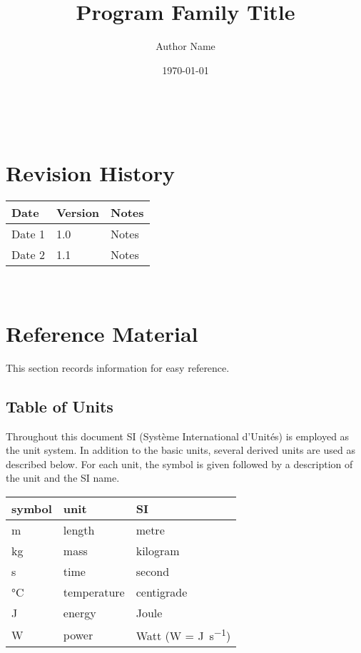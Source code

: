 \documentclass[12pt]{article}
\begin{document}
\title{Program Family Title} 
\author{Author Name}
\date{\today}

\maketitle

~\newpage


\section{Revision History}

\begin{tabularx}{\textwidth}{p{3cm}p{2cm}X}
\toprule {\bf Date} & {\bf Version} & {\bf Notes}\\
\midrule
Date 1 & 1.0 & Notes\\
Date 2 & 1.1 & Notes\\
\bottomrule
\end{tabularx}

~\newpage
	
\section{Reference Material}

This section records information for easy reference.

\subsection{Table of Units}

Throughout this document SI (Syst\`{e}me International d'Unit\'{e}s) is employed
as the unit system.  In addition to the basic units, several derived units are
used as described below.  For each unit, the symbol is given followed by a
description of the unit and the SI name.
~\newline

\renewcommand{\arraystretch}{1.2}
  \noindent \begin{tabular}{l l l} 
    \toprule		
    \textbf{symbol} & \textbf{unit} & \textbf{SI}\\
    \midrule 
    \si{\metre} & length & metre\\
    \si{\kilogram} & mass	& kilogram\\
    \si{\second} & time & second\\
    \si{\celsius} & temperature & centigrade\\
    \si{\joule} & energy & Joule\\
    \si{\watt} & power & Watt (W = \si{\joule\per\second})\\
    \bottomrule
  \end{tabular}
\end{document}
